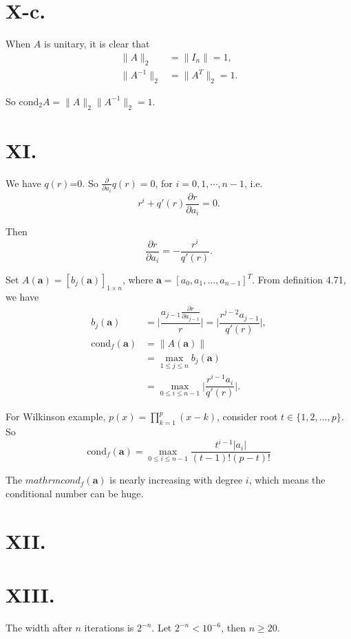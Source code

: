 \documentclass[a4paper]{article}
\begin{document}
\section*{X-c.}
When $A$ is unitary, it is clear that 
$$
\begin{aligned}
  \|A\|_2&=\|I_n\|=1, \\
  \|A^{-1}\|_2&=\|A^T\|_2=1.
\end{aligned}
$$

So $\mathrm{cond}_2 A=\|A\|_2 \|A^{-1}\|_2=1.$


\section*{XI.}
We have $q(r)$=0. So $\frac{\partial}{\partial a_i}q(r)=0$, for $i=0,1,\cdots,n-1$, i.e. 
$$
r^i+q'(r)\frac{\partial r}{\partial a_i}=0.
$$

Then 
$$
\frac{\partial r}{\partial a_i}=-\dfrac{r^i}{q'(r)}.
$$

Set $A(\mathbf{a})=[b_j(\mathbf{a})]_{1\times n}$, where $\mathbf{a}=[a_0,a_1,\ldots,a_{n-1}]^T$. From definition 4.71, we have 
$$
\begin{aligned}
  b_j(\mathbf{a})&=\lvert \dfrac{a_{j-1}\frac{\partial r}{\partial a_{j-1}}}{r} \rvert=\lvert \dfrac{r^{j-2}a_{j-1}}{q'(r)} \rvert,\\
  \mathrm{cond}_f(\mathbf{a})&=\|A(\mathbf{a})\|\\
  &=\max_{1\leq j\leq n}b_j(\mathbf{a})\\
  &=\max_{0\leq i\leq n-1}\lvert \dfrac{r^{i-1}a_{i}}{q'(r)} \rvert.
\end{aligned}
$$

For Wilkinson example, $p(x)=\prod_{k=1}^{p}(x-k)$, consider root $t\in\{1,2,\ldots,p\}$. So 
$$
\mathrm{cond}_f(\mathbf{a})=\max_{0\leq i \leq n-1} \frac{t^{i-1}|a_i|}{(t-1)!(p-t)!}
$$

The $mathrm{cond}_f(\mathbf{a})$ is nearly increasing with degree $i$, which means the conditional number can be huge.


\section*{XII.}



\section*{XIII.}
The width after $n$ iterations is $2^{-n}$. Let $2^{-n}<10^{-6}$, then $n\geq 20$.
\end{document}
